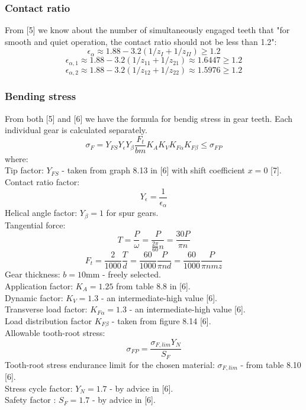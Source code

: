 \documentclass{article}
\begin{document}
\subsubsection{Contact ratio}
From [5] we know about the number of simultaneously engaged teeth that "for smooth and quiet operation, the contact ratio should not be less than 1.2":
$$ \epsilon_\alpha \approx 1.88 - 3.2 (1 / z_I + 1 / z_{II}) \geq 1.2 $$
$$ \epsilon_{\alpha, 1} \approx 1.88 - 3.2 (1 / z_{11} + 1 / z_{21}) \approx 1.6447 \geq 1.2 $$
$$ \epsilon_{\alpha, 2} \approx 1.88 - 3.2 (1 / z_{12} + 1 / z_{22}) \approx 1.5976 \geq 1.2 $$
\subsubsection{Bending stress}
From both [5] and [6] we have the formula for bendig stress in gear teeth.
Each individual gear is calculated separately.
\begin{equation} \sigma_F = Y_{FS} Y_\epsilon Y_\beta \frac{F_t}{b m} K_A K_V K_{F\alpha} K_{F\beta} \leq \sigma_{FP} \end{equation}
where: \\
Tip factor: $Y_{FS}$ - taken from graph 8.13 in [6] with shift coefficient $x = 0$ [7]. \\
Contact ratio factor: $$Y_\epsilon = \frac{1}{\epsilon_\alpha}$$
Helical angle factor: $Y_\beta = 1$ for spur gears. \\
Tangential force:
$$ T = \frac{P}{\omega} = \frac{P}{\frac{2 \pi}{60}n} = \frac{30 P}{\pi n}$$
$$ F_t = \frac{2}{1000}\frac{T}{d} = \frac{60}{1000}\frac{P}{\pi n d}  = \frac{60}{1000}\frac{P}{\pi n m z}$$
Gear thickness: $b = 10 \si{\milli\meter}$ - freely selected. \\
Application factor: $K_A = 1.25$ from table 8.8 in [6]. \\
Dynamic factor: $K_V = 1.3$ - an intermediate-high value [6]. \\
Transverse load factor: $K_{F\alpha} = 1.3$ - an intermediate-high value [6]. \\
Load distribution factor $K_{F\beta}$ - taken from figure 8.14 [6]. \\
Allowable tooth-root stress: $$\sigma_{FP} = \frac{\sigma_{F, lim} Y_N}{S_F}$$
Tooth-root stress endurance limit for the chosen material: $\sigma_{F, lim}$ - from table 8.10 [6]. \\
Stress cycle factor: $Y_N = 1.7$ - by advice in [6]. \\
Safety factor : $S_F = 1.7$ - by advice in [6]. \\[0.3cm]
\end{document}
